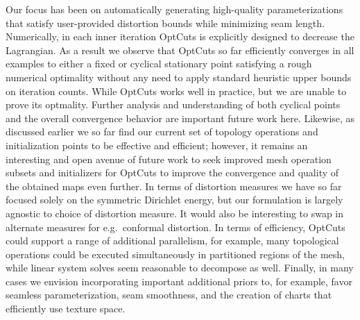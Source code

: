 Our focus has been on automatically generating high-quality parameterizations that satisfy user-provided distortion bounds while minimizing seam length. Numerically, in each inner iteration OptCuts is explicitly designed to decrease the Lagrangian. As a result we observe that OptCuts so far efficiently converges in all examples to either a fixed or cyclical stationary point satisfying a rough numerical optimality without any need to apply standard heuristic upper bounds on iteration counts. While OptCuts works well in practice, but we are unable to prove its optmality. Further analysis and understanding of both cyclical points and the overall convergence behavior are important future work here. Likewise, as discussed earlier we so far find our current set of topology operations and initialization points to be effective and efficient; however, it remains an interesting and open avenue of future work to seek improved mesh operation subsets and initializers for OptCuts to improve the convergence and quality of the obtained maps even further. In terms of distortion measures we have so far focused solely on the symmetric Dirichlet energy, but our formulation is largely agnostic to choice of distortion measure.  It would also be interesting to swap in alternate measures for e.g.\ conformal distortion. In terms of efficiency, OptCuts could support a range 
of additional parallelism, for example, many topological operations could be executed simultaneously in partitioned regions of the mesh, while linear system solves seem reasonable to decompose as well. Finally, in many cases we envision incorporating important additional priors to, for example, favor seamless parameterization, seam smoothness, and the creation of charts that efficiently use texture space. 


%

